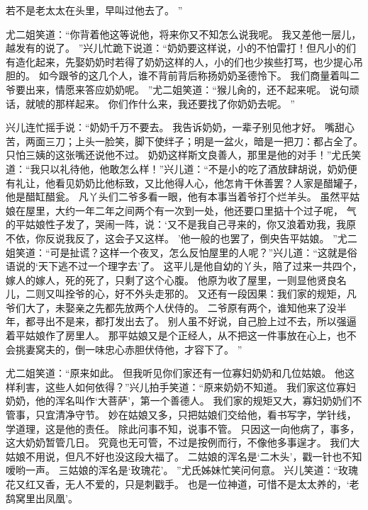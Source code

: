 若不是老太太在头里，早叫过他去了。
”\par
尤二姐笑道：“你背着他这等说他，将来你又不知怎么说我呢。
我又差他一层儿，越发有的说了。
”兴儿忙跪下说道：“奶奶要这样说，小的不怕雷打！但凡小的们有造化起来，先娶奶奶时若得了奶奶这样的人，小的们也少挨些打骂，也少提心吊胆的。
如今跟爷的这几个人，谁不背前背后称扬奶奶圣德怜下。
我们商量着叫二爷要出来，情愿来答应奶奶呢。
”尤二姐笑道：“猴儿肏的，还不起来呢。
说句顽话，就唬的那样起来。
你们作什么来，我还要找了你奶奶去呢。
”\par
兴儿连忙摇手说：“奶奶千万不要去。
我告诉奶奶，一辈子别见他才好。
嘴甜心苦，两面三刀；上头一脸笑，脚下使绊子；明是一盆火，暗是一把刀：都占全了。
只怕三姨的这张嘴还说他不过。
奶奶这样斯文良善人，那里是他的对手！”尤氏笑道：“我只以礼待他，他敢怎么样！”兴儿道：“不是小的吃了酒放肆胡说，奶奶便有礼让，他看见奶奶比他标致，又比他得人心，他怎肯干休善罢？人家是醋罐子，他是醋缸醋瓮。
凡丫头们二爷多看一眼，他有本事当着爷打个烂羊头。
虽然平姑娘在屋里，大约一年二年之间两个有一次到一处，他还要口里掂十个过子呢，
气的平姑娘性子发了，哭闹一阵，说：‘又不是我自己寻来的，你又浪着劝我，我原不依，你反说我反了，这会子又这样。
’他一般的也罢了，倒央告平姑娘。
”尤二姐笑道：“可是扯谎？这样一个夜叉，怎么反怕屋里的人呢？”兴儿道：“这就是俗语说的‘天下逃不过一个理字去’了。
这平儿是他自幼的丫头，陪了过来一共四个，嫁人的嫁人，死的死了，只剩了这个心腹。
他原为收了屋里，一则显他贤良名儿，二则又叫拴爷的心，好不外头走邪的。
又还有一段因果：我们家的规矩，凡爷们大了，未娶亲之先都先放两个人伏侍的。
二爷原有两个，谁知他来了没半年，都寻出不是来，都打发出去了。
别人虽不好说，自己脸上过不去，所以强逼着平姑娘作了房里人。
那平姑娘又是个正经人，从不把这一件事放在心上，也不会挑妻窝夫的，倒一味忠心赤胆伏侍他，才容下了。
”\par
尤二姐笑道：“原来如此。
但我听见你们家还有一位寡妇奶奶和几位姑娘。
他这样利害，这些人如何依得？”兴儿拍手笑道：“原来奶奶不知道。
我们家这位寡妇奶奶，他的浑名叫作‘大菩萨’，第一个善德人。
我们家的规矩又大，寡妇奶奶们不管事，只宜清净守节。
妙在姑娘又多，只把姑娘们交给他，看书写字，学针线，学道理，这是他的责任。
除此问事不知，说事不管。
只因这一向他病了，事多，这大奶奶暂管几日。
究竟也无可管，不过是按例而行，不像他多事逞才。
我们大姑娘不用说，但凡不好也没这段大福了。
二姑娘的浑名是‘二木头’，戳一针也不知嗳哟一声。
三姑娘的浑名是‘玫瑰花’。
”尤氏姊妹忙笑问何意。
兴儿笑道：“玫瑰花又红又香，无人不爱的，只是刺戳手。
也是一位神道，可惜不是太太养的，‘老鸹窝里出凤凰’。
